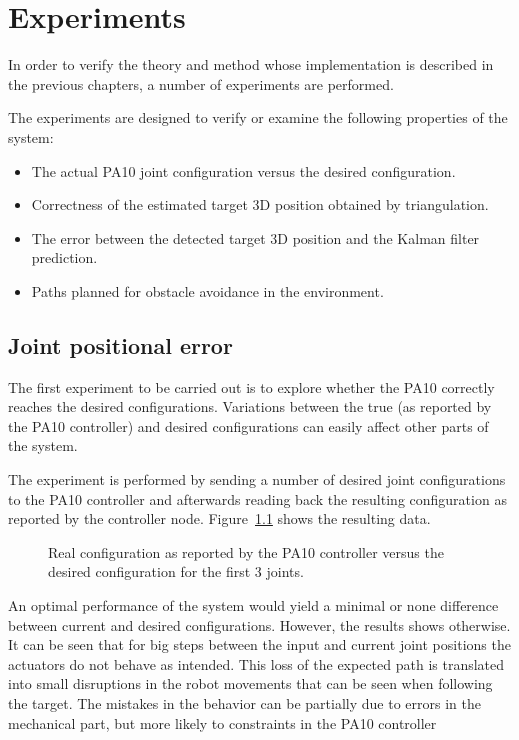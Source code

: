 \chapter{Experiments}
\label{cha:experiments}
In order to verify the theory and method whose implementation is described in the previous chapters, a number of experiments are performed.

The experiments are designed to verify or examine the following properties of the system:
\begin{itemize}
    \item The actual PA10 joint configuration versus the desired configuration.
    \item Correctness of the estimated target 3D position obtained by triangulation. %
    \item The error between the detected target 3D position and the Kalman filter prediction.
    \item Paths planned for obstacle avoidance in the environment.
\end{itemize}


\section{Joint positional error}\label{sec:joint_error}
The first experiment to be carried out is to explore whether the PA10 correctly reaches the desired configurations.
Variations between the true (as reported by the PA10 controller) and desired configurations can easily affect other parts of the system.

The experiment is performed by sending a number of desired joint configurations to the PA10 controller and afterwards reading back the resulting configuration as reported by the controller node. Figure~\ref{fig:q_real_desired} shows the resulting data.

\begin{figure}[htb]
    \centering
    \resizebox{.8\columnwidth}{!}{%
        
    }
    \caption{Real configuration as reported by the PA10 controller versus the desired configuration for the first 3 joints.}
    \label{fig:q_real_desired}
\end{figure}


An optimal performance of the system would yield a minimal or none difference between current and desired configurations. 
However, the results shows otherwise.
It can be seen that for big steps between the input and current joint positions the actuators do not behave as intended.
This loss of the expected path is translated into small disruptions in the robot movements that can be seen when following the target. 
The mistakes in the behavior can be partially due to errors in the mechanical part, but more likely to constraints in the PA10 controller

